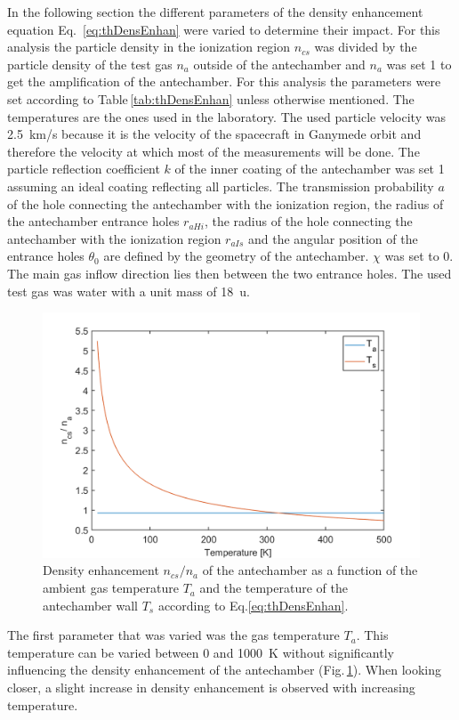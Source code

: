 	In the following section the different parameters of the density enhancement equation Eq.~\eqref{eq:thDensEnhan} were varied to determine their impact. For this analysis the particle density in the ionization region $n_{cs}$ was divided by the particle density of the test gas $n_a$ outside of the antechamber and $n_a$ was set 1 to get the amplification of the antechamber. For this analysis the parameters were set according to Table\,\ref{tab:thDensEnhan} unless otherwise mentioned. The temperatures are the ones used in the laboratory. The used particle velocity was 2.5~km/s because it is the velocity of the spacecraft in Ganymede orbit and therefore the velocity at which most of the measurements will be done.	The particle reflection coefficient $k$ of the inner coating of the antechamber was set 1 assuming an ideal coating reflecting all particles. The transmission probability $a$ of the hole connecting the antechamber with the ionization region, the radius of the antechamber entrance holes $r_{aHi}$, the radius of the hole connecting the antechamber with the ionization region $r_{aIs}$ and the angular position of the entrance holes $\theta_0$ are defined by the geometry of the antechamber. $\chi$ was set to 0\degree. The main gas inflow direction lies then between the two entrance holes. The used test gas was water with a unit mass of 18~u.
	\begin{figure}[H] %
		\centering
		\includegraphics[width= .7\textwidth]{Bilder/Ta_Ts.png}
		\caption{Density enhancement $n_{cs}/n_a$ of the antechamber as a function of the ambient gas temperature $T_a$ and the temperature of the antechamber wall $T_s$ according to Eq.\eqref{eq:thDensEnhan}.}
		\label{th:densEnhTaTs}
	\end{figure}
	The first parameter that was varied was the gas temperature $T_a$. This temperature can be varied between 0 and 1000~K without significantly influencing the density enhancement of the antechamber (Fig.\,\ref{th:densEnhTaTs}). When looking closer, a slight increase in density enhancement is observed with increasing temperature.\\
